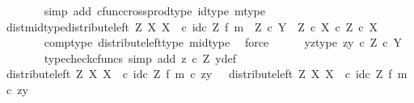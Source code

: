 \begin{isabellebody}
\ \ \ \ \ \ \isamarkupfalse%
\ {\isacharparenleft}{\kern0pt}simp\ add{\isacharcolon}{\kern0pt}\ cfunc{\isacharunderscore}{\kern0pt}cross{\isacharunderscore}{\kern0pt}prod{\isacharunderscore}{\kern0pt}type\ id{\isacharunderscore}{\kern0pt}type\ m{\isacharunderscore}{\kern0pt}type{\isacharparenright}{\kern0pt}\isanewline
\ \ \ \ \isamarkupfalse%
\ dist{\isacharunderscore}{\kern0pt}mid{\isacharunderscore}{\kern0pt}type{\isacharcolon}{\kern0pt}{\isachardoublequoteopen}distribute{\isacharunderscore}{\kern0pt}left\ Z\ X\ X\ \ {\isasymcirc}\isactrlsub c\ {\isacharparenleft}{\kern0pt}id\isactrlsub c\ Z\ {\isasymtimes}\isactrlsub f\ m{\isacharparenright}{\kern0pt}\ {\isacharcolon}{\kern0pt}\ Z\ {\isasymtimes}\isactrlsub c\ Y\ {\isasymrightarrow}\ {\isacharparenleft}{\kern0pt}Z\ {\isasymtimes}\isactrlsub c\ X{\isacharparenright}{\kern0pt}\ {\isasymtimes}\isactrlsub c\ Z\ {\isasymtimes}\isactrlsub c\ X{\isachardoublequoteclose}\isanewline
\ \ \ \ \ \ \isamarkupfalse%
\ comp{\isacharunderscore}{\kern0pt}type\ distribute{\isacharunderscore}{\kern0pt}left{\isacharunderscore}{\kern0pt}type\ mid{\isacharunderscore}{\kern0pt}type\ \isamarkupfalse%
\ force\isanewline
\ \ \ \ \isamarkupfalse%
\ yz{\isacharunderscore}{\kern0pt}type{\isacharcolon}{\kern0pt}\ {\isachardoublequoteopen}{\isasymlangle}z{\isacharcomma}{\kern0pt}y{\isasymrangle}\ {\isasymin}\isactrlsub c\ Z\ {\isasymtimes}\isactrlsub c\ Y{\isachardoublequoteclose}\isanewline
\ \ \ \ \ \ \isamarkupfalse%
\ {\isacharparenleft}{\kern0pt}typecheck{\isacharunderscore}{\kern0pt}cfuncs{\isacharcomma}{\kern0pt}\ simp\ add{\isacharcolon}{\kern0pt}\ {\isacartoucheopen}z\ {\isasymin}\isactrlsub c\ Z{\isacartoucheclose}\ y{\isacharunderscore}{\kern0pt}def{\isacharparenright}{\kern0pt}\isanewline
\ \ \ \ \isamarkupfalse%
\ {\isachardoublequoteopen}{\isacharparenleft}{\kern0pt}distribute{\isacharunderscore}{\kern0pt}left\ Z\ X\ X\ \ {\isasymcirc}\isactrlsub c\ {\isacharparenleft}{\kern0pt}id\isactrlsub c\ Z\ {\isasymtimes}\isactrlsub f\ m{\isacharparenright}{\kern0pt}{\isacharparenright}{\kern0pt}\ {\isasymcirc}\isactrlsub c\ {\isasymlangle}z{\isacharcomma}{\kern0pt}y{\isasymrangle}\ \ {\isacharequal}{\kern0pt}\ distribute{\isacharunderscore}{\kern0pt}left\ Z\ X\ X\ \ {\isasymcirc}\isactrlsub c\ {\isacharparenleft}{\kern0pt}id\isactrlsub c\ Z\ {\isasymtimes}\isactrlsub f\ m{\isacharparenright}{\kern0pt}\ {\isasymcirc}\isactrlsub c\ {\isasymlangle}z{\isacharcomma}{\kern0pt}y{\isasymrangle}{\isachardoublequoteclose}\isanewline

\end{isabellebody}
